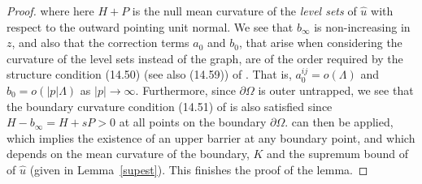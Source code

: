 \documentclass[11pt]{amsart}
\begin{document}
\begin{proof}
where here $H+P$ is the null mean curvature of the {\it level sets} of $\hat u$ with respect to the outward pointing unit normal. We see that $b_{\infty}$ is non-increasing in $z$, and also that the correction terms $a_0$ and $b_0$, that arise when considering the curvature of the level sets instead of the graph, are of the order required by the structure condition (14.50) (see also (14.59)) of  \cite[Theorem 14.6]{GT01}. That is, $a_0^{ij}=o(\Lambda)$ and $b_0=o(|p|\Lambda)$ as $|p|\to\infty$. Furthermore, since $\partial \Omega$ is outer untrapped, we see that the boundary curvature condition (14.51) of  \cite[Theorem 14.6]{GT01} is also satisfied since $H-b_{\infty}=H+sP> 0$ at all points on the boundary $\partial\Omega$.  \cite[Theorem 14.6]{GT01} can then be applied, which implies the existence of an upper barrier at any boundary point, and which  depends on the mean curvature of the boundary, $K$ and the supremum bound of of $\hat{u}$ (given in Lemma~\ref{supest}). This finishes the proof of the lemma.
\end{proof}
\end{document}
